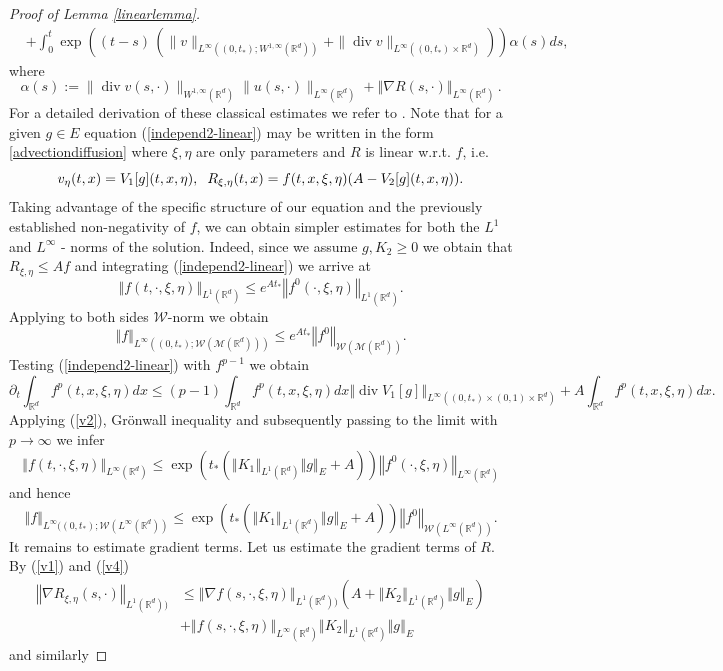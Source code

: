 \documentclass[10pt]{article}
\def\divv{\operatorname {div}}
\newcommand{\eqq}[2]{\begin{equation}  #1  \label{#2}\end{equation}    }
\newcommand{\hd}{\hspace{0.2cm}}
\newcommand*{\norm}[1]{\left\Vert{#1}\right\Vert}
\newcommand{\R}{\mathbb{R}}
\newcommand{\ird}{\int_{\mathbb{R}^d}}
\newcommand{\W}{\mathcal{W}}
\begin{document}
\begin{proof}[Proof of Lemma \ref{linearlemma}]
\begin{align}
 &+\int_0^t \exp\left((t-s)\,\left(\| v\|_{L^\infty((0,t_*); W^{1,\infty}(\R^d))}+\|\divv v\|_{L^\infty((0,t_{*})\times \R^d)}\right)\right)\alpha(s) ds, 
\end{align}
where
\[
\alpha(s) := \|\divv v(s,\cdot)\|_{W^{1,\infty}(\R^d)}\|u(s,\cdot)\|_{L^{\infty}(\R^d)} + \norm{\nabla R(s,\cdot)}_{L^{\infty} (\R^d)}\,.
\]
For a detailed derivation of these classical estimates we refer to  \cite[Appendix]{nasza}.
Note that for a given $g\in E$ equation (\ref{independ2-linear}) may be written in the form \eqref{advectiondiffusion} where $\xi,\eta$ are only parameters and $R$ is linear w.r.t. $f$, i.e. 
\[
v_{\eta}(t,x)=V_1[g](t,x,\eta), \hd R_{\xi,\eta}(t,x) = f(t,x,\xi,\eta) (A -V_2[g](t,x,\eta) ). 
\]
Taking advantage of the specific structure of our equation and the previously established non-negativity of $f$, we can obtain simpler estimates for both the $L^1$ and $L^
 \infty$ - norms of the solution. Indeed, since we assume $g,K_2 \geq 0$ we obtain that $R_{\xi,\eta} \leq Af$ and integrating (\ref{independ2-linear}) we arrive at 
 \eqq{
 \norm{f(t,\cdot,\xi,\eta)}_{L^{1}(\R^d)} \leq e^{At_{*}}\norm{f^0(\cdot,\xi,\eta)}_{L^{1}(\R^d)}.
}{l1bound0}
Applying to both sides $\W$-norm we obtain 
\eqq{
\norm{f}_{L^{\infty}((0,t_*); \W(\mathcal{M}(\R^d)))} \leq e^{At_{*}}\norm{f^0}_{\W(\mathcal{M}(\R^d))}.
}{l1bound}
Testing (\ref{independ2-linear}) with $f^{p-1}$  we obtain
\[
\partial_t\ird f^{p}(t,x,\xi,\eta)dx \leq (p-1)\ird f^{p}(t,x,\xi,\eta)dx \norm{\divv V_1[g]}_{L^{\infty}((0,t_{*})\times (0,1)\times \R^d)} + A \ird f^{p}(t,x,\xi,\eta)dx. 
\]
Applying (\ref{v2}), Gr\"onwall inequality and subsequently  passing to the limit with $p\rightarrow \infty$ we infer
\eqq{
\norm{f(t,\cdot,\xi,\eta)}_{L^{\infty}(\R^d)}
\leq \exp\left(t_{*}\left(\norm{K_{1}}_{L^{1}(\R^d)}\norm{ g}_{E} +A\right)\right)\norm{f^0(\cdot,\xi,\eta)}_{L^{\infty}( \R^d)}
}{finfty0}
and hence
\eqq{
\norm{f}_{L^{\infty}((0,t_{*});\W(L^{\infty}(\R^d))}
\leq \exp\left(t_{*}\left(\norm{K_{1}}_{L^{1}(\R^d)}\norm{ g}_{E} +A\right)\right)\norm{f^0}_{\W(L^{\infty}( \R^d))}.
}{finfty}
It remains to estimate gradient terms. 
Let us estimate the gradient terms of $R$. By (\ref{v1}) and (\ref{v4}) 
\begin{align}\label{Rgrad1}
  \norm{\nabla R_{\xi,\eta}(s,\cdot)}_{L^{1}(\R^d))} & \leq \norm{\nabla f(s,\cdot,\xi,\eta)}_{L^{1}(\R^d))}\left(A+\norm{K_{2}}_{L^{1}(\R^d)}\norm{g}_{E}\right)\\ \nonumber  
  &+\norm{f(s,\cdot,\xi,\eta)}_{L^{\infty}(\R^d)}   \norm{K_{2}}_{L^{1}(\R^d)}\norm{g}_{E}
\end{align}
and similarly 


\end{proof}
\end{document}
